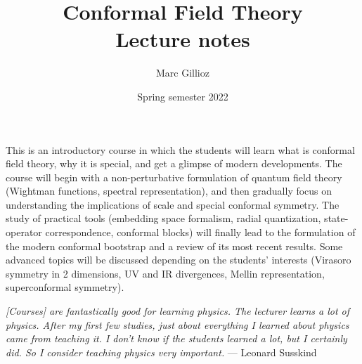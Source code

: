 \documentclass[a4paper,12pt]{article}
\title{%
Conformal Field Theory
\\[1em]
\Large
Lecture notes}
\author{Marc Gillioz}
\date{Spring semester 2022}
\numberwithin{equation}{section}
\begin{document}
 

\maketitle

\vspace{10mm}	
	
\begin{center}
	
\parbox{\textwidth}{%

This is an introductory course in which the students will learn what is conformal field theory, why it is special, and get a glimpse of modern developments. The course will begin with a non-perturbative formulation of quantum field theory (Wightman functions, spectral representation), and then gradually focus on understanding the implications of scale and special conformal symmetry. The study of practical tools (embedding space formalism, radial quantization, state-operator correspondence, conformal blocks) will finally lead to the formulation of the modern conformal bootstrap and a review of its most recent results. Some advanced topics will be discussed depending on the students' interests (Virasoro symmetry in 2 dimensions, UV and IR divergences, Mellin representation, superconformal symmetry).}
	
\vspace{20mm}
	
\parbox{11.8cm}{
\emph{%
[Courses] are fantastically good for learning physics. The lecturer learns a lot of physics. After my first few studies, just about everything I learned about physics came from teaching it. I don’t know if the students learned a lot, but I certainly did. So I consider teaching physics very important.}
--- Leonard Susskind \cite{Susskind}}

\end{center}


\newpage

\tableofcontents

\end{document}
